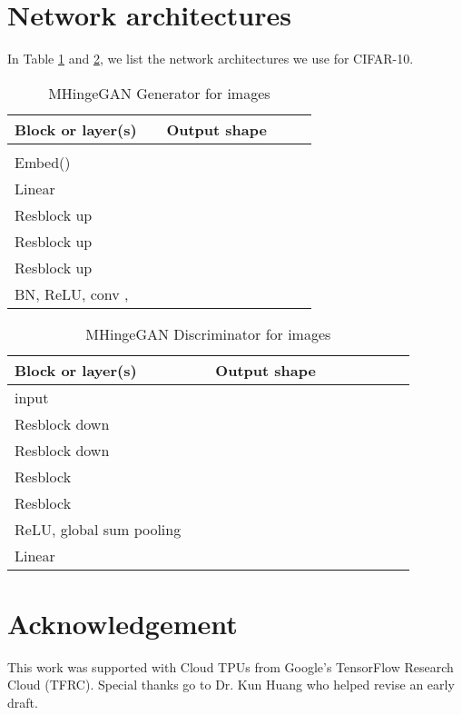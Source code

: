 \documentclass[conference]{IEEEtran}
\begin{document}
\section{Network architectures}\label{architectures}
In Table \ref{CIFAR_G} and \ref{CIFAR_D}, we list the network architectures we use for CIFAR-10.
\begin{table}[!h]
	\caption{MHingeGAN Generator for  images}\label{CIFAR_G}
	\centering
	\footnotesize \setlength{\tabcolsep}{4pt}\renewcommand{\arraystretch}{1.2}\centering
	\begin{tabular}[h]{p{0.45\linewidth}p{0.45\linewidth}}
		\toprule
		\midrule
		{Block or layer(s)} &{Output shape}\\
		\midrule
		  &    \\
		\midrule 
		Embed()  & {}\\
        \midrule
        Linear & \\
        \midrule
        Resblock up  & \\
        \midrule
        Resblock up  & \\
        \midrule
        Resblock up  & \\
       \midrule
        BN, ReLU, conv ,  & \\
		\midrule
		\bottomrule
	\end{tabular}
\end{table}

\begin{table}[!h]
	\caption{MHingeGAN Discriminator for  images}\label{CIFAR_D}
	\centering
	\footnotesize \setlength{\tabcolsep}{4pt}\renewcommand{\arraystretch}{1.2}\centering
	\begin{tabular}[h]{p{0.45\linewidth}p{0.45\linewidth}}
		\toprule
		\midrule
		{Block or layer(s)} &{Output shape}\\
		\midrule
		input & \\
		\midrule
        Resblock down  & \\
        \midrule
        Resblock down  & \\
        \midrule
        Resblock   & \\
        \midrule
        Resblock   & \\
       \midrule
        ReLU, global sum pooling & \\
        \midrule
        Linear& \\
		\midrule
		\bottomrule
	\end{tabular}
\end{table}


\section*{Acknowledgement}
This work was supported with Cloud TPUs from Google's TensorFlow Research Cloud (TFRC). Special thanks go to Dr. Kun Huang who helped revise an early draft.



~\\
~\\
\end{document}
